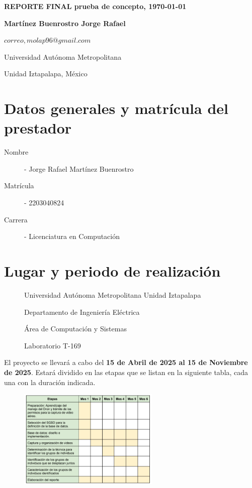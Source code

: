 \documentclass[letterpaper,11pt,twoside]{report}
\date{}
\begin{document}
	\centerline{\bf REPORTE FINAL prueba de concepto, \today}
	\centerline{}
	\begin{center}
		\Large{\textsc{}}
	\end{center}
	
	\centerline{}
	\centerline{\textbf{Martínez Buenrostro Jorge Rafael}}
	\centerline{}
	
	\centerline{$correo, molap96@gmail.com$}
	
        \centerline{Universidad Aut\'onoma Metropolitana} 
	\centerline{Unidad Iztapalapa, M\'exico}
	
	\bigskip


	\section{Datos generales y matrícula del prestador}
	\begin{description}
		\item[Nombre] - Jorge Rafael Mart\'inez Buenrostro
		\item[Matr\'icula] - 2203040824
		\item[Carrera] - Licenciatura en Computación
	\end{description}


	\section{Lugar y periodo de realizaci\'on}
	\begin{description}
		\item[] Universidad Aut\'onoma Metropolitana Unidad Iztapalapa
		\item[] Departamento de Ingenier\'ia El\'ectrica
		\item[] \'Area de Computaci\'on y Sistemas
		\item[] Laboratorio T-169
	\end{description}
	\noindent El proyecto se llevar\'a a cabo del \textbf{15 de Abril de 2025 al 15 de Noviembre de 2025}. Estar\'a dividido en las etapas
	que se listan en la siguiente tabla, cada una con la duraci\'on indicada.
	\begin{figure}[H]
		\centering
		\includegraphics[width=0.6\textwidth]{img/gantt.png}
	\end{figure}
\end{document}
